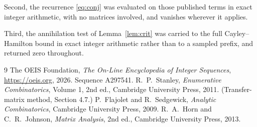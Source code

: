 \documentclass[11pt,a4paper]{article}
\theoremstyle{plain}
\theoremstyle{definition}
\begin{document}
Second, the recurrence \eqref{eq:conj} was evaluated on those published terms in exact
integer arithmetic, with no matrices involved, and vanishes wherever it applies.

Third, the annihilation test of Lemma~\ref{lem:crit} was carried to the full
Cayley--Hamilton bound in exact integer arithmetic rather than to a sampled prefix, and
returned zero throughout.

\begin{thebibliography}{9}
 The OEIS Foundation, \emph{The On-Line Encyclopedia of Integer
Sequences}, \url{https://oeis.org}, 2026. Sequence A297541.
 R.~P.~Stanley, \emph{Enumerative Combinatorics}, Volume 1, 2nd ed.,
Cambridge University Press, 2011. (Transfer-matrix method, Section 4.7.)
 P.~Flajolet and R.~Sedgewick, \emph{Analytic Combinatorics}, Cambridge
University Press, 2009.
 R.~A.~Horn and C.~R.~Johnson, \emph{Matrix Analysis}, 2nd ed., Cambridge
University Press, 2013.
\end{thebibliography}
\end{document}
